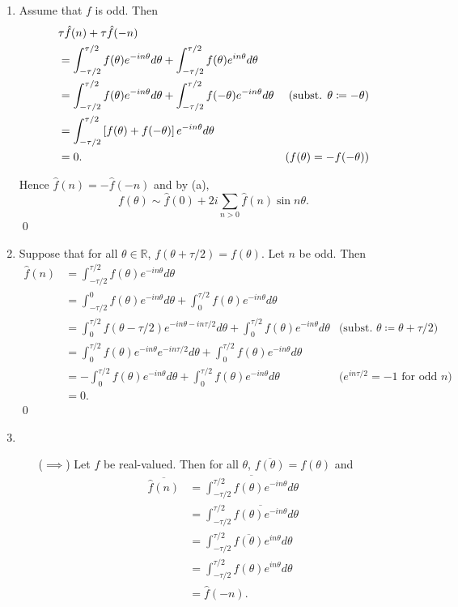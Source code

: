 \documentclass[oneside]{article}
\newcommand\bbR{\mathbb{R}}
\begin{document}
\begin{enumerate}[label=(\alph*)]
  \item Assume that $f$ is odd. Then\begin{align*}
      &\tau\hat f(n) + \tau\hat f(-n) \\
      &= \int_{-\tau/2}^{\tau/2} f(\theta)e^{-in\theta}d\theta
      + \int_{-\tau/2}^{\tau/2} f(\theta)e^{in\theta}d\theta \\
      &= \int_{-\tau/2}^{\tau/2} f(\theta)e^{-in\theta}d\theta
      + \int_{-\tau/2}^{\tau/2} f(-\theta)e^{-in\theta}d\theta
      & \text{(subst. $\theta \coloneqq -\theta$)}\\
      &= \int_{-\tau/2}^{\tau/2} \left[f(\theta) + f(-\theta)\right]e^{-in\theta}d\theta \\
      &= 0\text. &\text{($f(\theta) = -f(-\theta)$)}
    \end{align*}

    Hence $\hat f(n) = -\hat f(-n)$ and by (a), \[
      f(\theta) \sim \hat f(0)
       + 2i\sum_{n > 0} \hat f(n)\sin n\theta\text{.}
    \] \qed

  \item Suppose that for all $\theta \in \bbR$,
  $f(\theta + \tau/2) = f(\theta)$. Let $n$ be odd. Then \begin{align*}
    \hat f(n)
    &= \int_{-\tau/2}^{\tau/2} f(\theta)e^{-in\theta}d\theta \\
    &= \int_{-\tau/2}^0 f(\theta)e^{-in\theta}d\theta
    + \int_0^{\tau/2} f(\theta)e^{-in\theta}d\theta \\
    &= \int_0^{\tau/2} f(\theta - \tau/2)e^{-in\theta - in\tau/2}d\theta
    + \int_0^{\tau/2} f(\theta)e^{-in\theta}d\theta
    & \text{(subst. $\theta \coloneqq \theta + \tau/2$)} \\
    &= \int_0^{\tau/2} f(\theta)e^{-in\theta}e^{-in\tau/2}d\theta
    + \int_0^{\tau/2} f(\theta)e^{-in\theta}d\theta \\
    &= -\int_0^{\tau/2} f(\theta)e^{-in\theta}d\theta
    + \int_0^{\tau/2} f(\theta)e^{-in\theta}d\theta
    &\text{($e^{in\tau/2} = -1$ for odd $n$)} \\
    &= 0 \text{.}
  \end{align*} \qed

  \item \begin{itemize}[leftmargin=34pt]
    \item[($\implies$)] Let $f$ be real-valued. Then
    for all $\theta$, $\overline{f(\theta)} = f(\theta)$ and \begin{align*}
      \overline{\hat{f}(n)}
      &= \overline{\int_{-\tau/2}^{\tau/2} f(\theta)e^{-in\theta}d\theta} \\
      &= \int_{-\tau/2}^{\tau/2} \overline{f(\theta)e^{-in\theta}}d\theta \\
      &= \int_{-\tau/2}^{\tau/2} \overline{f(\theta)}e^{in\theta}d\theta \\
      &= \int_{-\tau/2}^{\tau/2} f(\theta)e^{in\theta}d\theta \\
      &= \hat{f}(-n)\text{.}
    \end{align*}


\end{itemize}
\end{enumerate}
\end{document}
